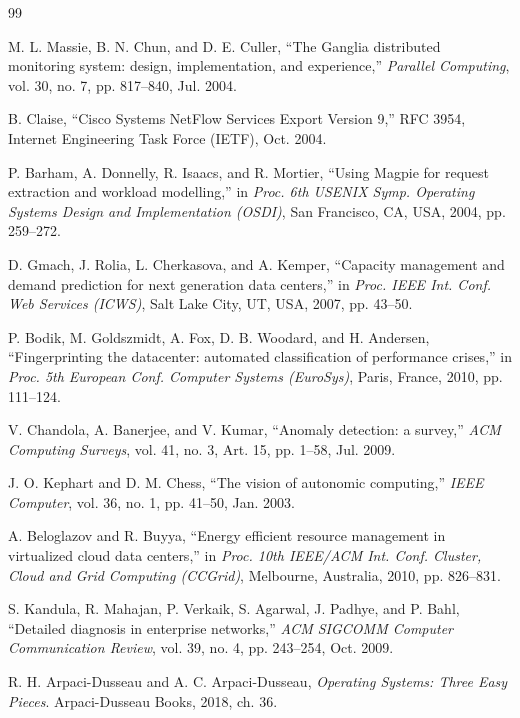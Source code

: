 \documentclass{ieeeaccess}
\begin{document}
\begin{thebibliography}{99}

M. L. Massie, B. N. Chun, and D. E. Culler, ``The Ganglia distributed monitoring system: design, implementation, and experience,'' \textit{Parallel Computing}, vol. 30, no. 7, pp. 817--840, Jul. 2004.

B. Claise, ``Cisco Systems NetFlow Services Export Version 9,'' RFC 3954, Internet Engineering Task Force (IETF), Oct. 2004.

P. Barham, A. Donnelly, R. Isaacs, and R. Mortier, ``Using Magpie for request extraction and workload modelling,'' in \textit{Proc. 6th USENIX Symp. Operating Systems Design and Implementation (OSDI)}, San Francisco, CA, USA, 2004, pp. 259--272.

D. Gmach, J. Rolia, L. Cherkasova, and A. Kemper, ``Capacity management and demand prediction for next generation data centers,'' in \textit{Proc. IEEE Int. Conf. Web Services (ICWS)}, Salt Lake City, UT, USA, 2007, pp. 43--50.

P. Bodik, M. Goldszmidt, A. Fox, D. B. Woodard, and H. Andersen, ``Fingerprinting the datacenter: automated classification of performance crises,'' in \textit{Proc. 5th European Conf. Computer Systems (EuroSys)}, Paris, France, 2010, pp. 111--124.

V. Chandola, A. Banerjee, and V. Kumar, ``Anomaly detection: a survey,'' \textit{ACM Computing Surveys}, vol. 41, no. 3, Art. 15, pp. 1--58, Jul. 2009.

J. O. Kephart and D. M. Chess, ``The vision of autonomic computing,'' \textit{IEEE Computer}, vol. 36, no. 1, pp. 41--50, Jan. 2003.

A. Beloglazov and R. Buyya, ``Energy efficient resource management in virtualized cloud data centers,'' in \textit{Proc. 10th IEEE/ACM Int. Conf. Cluster, Cloud and Grid Computing (CCGrid)}, Melbourne, Australia, 2010, pp. 826--831.

S. Kandula, R. Mahajan, P. Verkaik, S. Agarwal, J. Padhye, and P. Bahl, ``Detailed diagnosis in enterprise networks,'' \textit{ACM SIGCOMM Computer Communication Review}, vol. 39, no. 4, pp. 243--254, Oct. 2009.

R. H. Arpaci-Dusseau and A. C. Arpaci-Dusseau, \textit{Operating Systems: Three Easy Pieces}. Arpaci-Dusseau Books, 2018, ch. 36.


\end{thebibliography}
\end{document}
